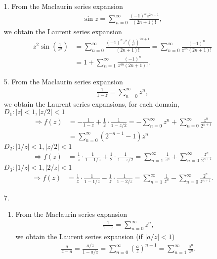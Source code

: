 \documentclass[a4paper,12pt]{article}
\begin{document}
\begin{enumerate}
    \item[1.]
        From the Maclaurin series expansion
        \begin{align*}
            \sin z = \sum_{n = 0}^\infty \frac{(-1)^n z^{2n + 1}}{(2n + 1)!},
        \end{align*}
        we obtain the Laurent series expansion
        \begin{align*}
            z^2 \sin \left( \frac{1}{z^2} \right) &= \sum_{n = 0}^\infty \frac{(-1)^n z^2 \left( \frac{1}{z^2} \right)^{2n + 1}}{(2n + 1)!}
            = \sum_{n = 0}^\infty \frac{(-1)^n}{z^{4n} (2n + 1)!} \\
            &= 1 + \sum_{n = 1}^\infty \frac{(-1)^n}{z^{4n} (2n + 1)!}.
        \end{align*}

    \item[5.]
        From the Maclaurin series expansion
        \begin{align*}
            \frac{1}{1 - z} = \sum_{n = 0}^\infty z^n,
        \end{align*}
        we obtain the Laurent series expansions, for each domain, \\
        $D_1: |z| < 1, \left| z/2 \right| < 1$
        \begin{align*}
            \Rightarrow f(z) &= -\frac{1}{1 - z} + \frac{1}{2} \cdot \frac{1}{1 - z/2}
            = -\sum_{n = 0}^\infty z^n + \sum_{n = 0}^\infty \frac{z^n}{2^{n + 1}} \\
            &= \sum_{n = 0}^\infty (2^{-n - 1} - 1) z^n
        \end{align*}
        $D_2: \left| 1/z \right| < 1, \left| z/2 \right| < 1$
        \begin{align*}
            \Rightarrow f(z) &= \frac{1}{z} \cdot \frac{1}{1 - 1/z} + \frac{1}{2} \cdot \frac{1}{1 - z/2}
            = \sum_{n = 1}^\infty \frac{1}{z^n} + \sum_{n = 0}^\infty \frac{z^n}{2^{n + 1}}
        \end{align*}
        $D_3: \left| 1/z \right| < 1, \left| 2/z \right| < 1$
        \begin{align*}
            \Rightarrow f(z) &= \frac{1}{z} \cdot \frac{1}{1 - 1/z} - \frac{1}{z} \cdot \frac{1}{1 - 2/z} = \sum_{n = 1}^\infty \frac{1}{z^n} - \sum_{n = 0}^\infty \frac{2^n}{z^{n + 1}}.
        \end{align*}

    \item[7.]
        \begin{enumerate}
            \item
                From the Maclaurin series expansion
                \begin{align*}
                    \frac{1}{1 - z} = \sum_{n = 0}^\infty z^n,
                \end{align*}
                we obtain the Laurent series expansion (if $|a/z| < 1$)
                \begin{align*}
                    \frac{a}{z - a} = \frac{a/z}{1 - a/z} = \sum_{n = 0}^\infty \left( \frac{a}{z} \right)^{n + 1} = \sum_{n = 1}^\infty \frac{a^n}{z^n}.
                \end{align*}


\end{enumerate}
\end{enumerate}
\end{document}
